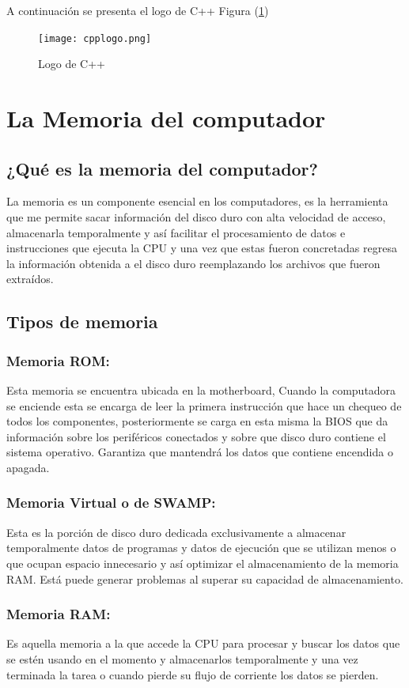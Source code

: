 \documentclass{article}
\begin{document}
A continuación se presenta el logo de C++ Figura (\ref{fig:cpplogo})

\begin{figure}[h]
\texttt{[image: cpplogo.png]}
\centering
\caption{Logo de C++}
\label{fig:cpplogo}
\end{figure}
\section{La Memoria del computador}
\subsection{¿Qué es la memoria del computador?}
La memoria es un componente esencial en los computadores, es la herramienta que me permite sacar información del disco duro con alta velocidad de acceso, almacenarla temporalmente y así facilitar el procesamiento de datos e instrucciones que ejecuta la CPU y una vez que estas fueron concretadas regresa la información obtenida a el disco duro reemplazando los archivos que fueron extraídos.
\subsection{Tipos de memoria}
\subsubsection{Memoria ROM:}
Esta memoria se encuentra ubicada en la motherboard, Cuando la computadora se enciende esta se encarga de leer la primera instrucción que hace un chequeo de todos los componentes, posteriormente se carga en esta misma la BIOS que da información sobre los periféricos conectados y sobre que disco duro contiene el sistema operativo. Garantiza que mantendrá los datos que contiene encendida o apagada.
\subsubsection{Memoria Virtual o de SWAMP:}
Esta es la porción de disco duro dedicada exclusivamente a almacenar temporalmente datos de programas y datos de ejecución que se utilizan menos o que ocupan espacio innecesario y así optimizar el almacenamiento de la memoria RAM. Está puede generar problemas al superar su capacidad de almacenamiento.
\subsubsection{Memoria RAM:}
Es aquella memoria a la que accede la CPU para procesar y buscar los datos que se estén usando en el momento y almacenarlos temporalmente y una vez terminada la tarea o cuando pierde su flujo de corriente los datos se pierden.
\end{document}
